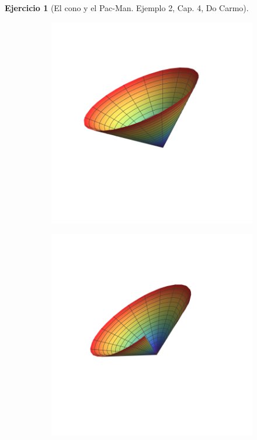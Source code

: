 \documentclass[spanish]{book}
\theoremstyle{definition}
\newtheorem*{ejer}{Ejercicio}
\begin{document}
\begin{ejer}[El cono y el Pac-Man. Ejemplo 2, Cap. 4, Do Carmo]
\begin{figure}[H]
\begin{subfigure}{.5\textwidth}
		\end{subfigure}
	\end{figure}
	\vspace{-2cm}
	\begin{figure}[H]
		\begin{subfigure}{.3\textwidth}
			\centering
			\includegraphics[width=\linewidth]{sup17}
		\end{subfigure}	\hspace{-1.2cm}
		\begin{subfigure}{.3\textwidth}
			\centering
			\includegraphics[width=\linewidth]{sup18}

\end{subfigure}
\end{figure}
\end{ejer}
\end{document}
